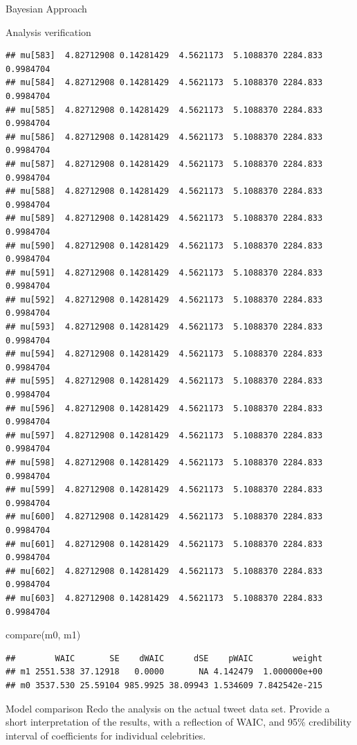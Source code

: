 \documentclass[
  ignorenonframetext,
]{beamer}
\newenvironment{Shaded}{\begin{snugshade}}{\end{snugshade}}
\newcommand{\FunctionTok}[1]{\textcolor[rgb]{0.00,0.00,0.00}{#1}}
\newcommand{\NormalTok}[1]{#1}
\begin{document}
\begin{frame}[fragile]{Bayesian Approach}
\begin{block}{Analysis verification}
\begin{verbatim}
## mu[583]  4.82712908 0.14281429  4.5621173  5.1088370 2284.833 0.9984704
## mu[584]  4.82712908 0.14281429  4.5621173  5.1088370 2284.833 0.9984704
## mu[585]  4.82712908 0.14281429  4.5621173  5.1088370 2284.833 0.9984704
## mu[586]  4.82712908 0.14281429  4.5621173  5.1088370 2284.833 0.9984704
## mu[587]  4.82712908 0.14281429  4.5621173  5.1088370 2284.833 0.9984704
## mu[588]  4.82712908 0.14281429  4.5621173  5.1088370 2284.833 0.9984704
## mu[589]  4.82712908 0.14281429  4.5621173  5.1088370 2284.833 0.9984704
## mu[590]  4.82712908 0.14281429  4.5621173  5.1088370 2284.833 0.9984704
## mu[591]  4.82712908 0.14281429  4.5621173  5.1088370 2284.833 0.9984704
## mu[592]  4.82712908 0.14281429  4.5621173  5.1088370 2284.833 0.9984704
## mu[593]  4.82712908 0.14281429  4.5621173  5.1088370 2284.833 0.9984704
## mu[594]  4.82712908 0.14281429  4.5621173  5.1088370 2284.833 0.9984704
## mu[595]  4.82712908 0.14281429  4.5621173  5.1088370 2284.833 0.9984704
## mu[596]  4.82712908 0.14281429  4.5621173  5.1088370 2284.833 0.9984704
## mu[597]  4.82712908 0.14281429  4.5621173  5.1088370 2284.833 0.9984704
## mu[598]  4.82712908 0.14281429  4.5621173  5.1088370 2284.833 0.9984704
## mu[599]  4.82712908 0.14281429  4.5621173  5.1088370 2284.833 0.9984704
## mu[600]  4.82712908 0.14281429  4.5621173  5.1088370 2284.833 0.9984704
## mu[601]  4.82712908 0.14281429  4.5621173  5.1088370 2284.833 0.9984704
## mu[602]  4.82712908 0.14281429  4.5621173  5.1088370 2284.833 0.9984704
## mu[603]  4.82712908 0.14281429  4.5621173  5.1088370 2284.833 0.9984704
\end{verbatim}

\begin{Shaded}
\begin{Highlighting}[]
\FunctionTok{compare}\NormalTok{(m0, m1)}
\end{Highlighting}
\end{Shaded}

\begin{verbatim}
##        WAIC       SE    dWAIC      dSE    pWAIC        weight
## m1 2551.538 37.12918   0.0000       NA 4.142479  1.000000e+00
## m0 3537.530 25.59104 985.9925 38.09943 1.534609 7.842542e-215
\end{verbatim}
\end{block}

\begin{block}{Model comparison}
\protect\hypertarget{model-comparison}{}
Redo the analysis on the actual tweet data set. Provide a short
interpretation of the results, with a reflection of WAIC, and 95\%
credibility interval of coefficients for individual celebrities.


\end{block}
\end{frame}
\end{document}
